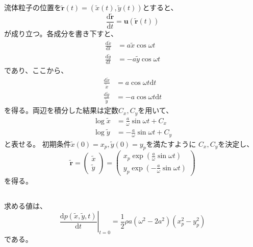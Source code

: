 \documentclass[a4paper]{jsarticle}
\begin{document}
\subsection{}
流体粒子の位置を$\tilde{\boldsymbol{r}}(t) = (\tilde{x}(t), \tilde{y}(t))$とすると、
\begin{equation}
  \frac{\mathrm{d} \tilde{\boldsymbol{r}}}{\mathrm{d} t} = \boldsymbol{u}(\tilde{\boldsymbol{r}}(t)) 
\end{equation}
が成り立つ。各成分を書き下すと、
\begin{equation}
  \begin{aligned}
    \frac{\mathrm{d} \tilde{x}}{\mathrm{d} t} &= a \tilde{x} \cos \omega t \\
    \frac{\mathrm{d} \tilde{y}}{\mathrm{d} t} &= -a \tilde{y} \cos \omega t
  \end{aligned}
\end{equation}
であり、ここから、
\begin{equation}
  \begin{aligned}
    \frac{\mathrm{d} \tilde{x}}{\tilde{x}} &= a \cos \omega t \mathrm{d} t \\
    \frac{\mathrm{d} \tilde{y}}{\tilde{y}} &= -a \cos \omega t \mathrm{d} t
  \end{aligned}
\end{equation}
を得る。両辺を積分した結果は定数$C_x, C_y$を用いて、
\begin{equation}
  \begin{aligned}
    \log \tilde{x} &= \frac{a}{\omega} \sin \omega t + C_x \\
    \log \tilde{y} &= -\frac{a}{\omega} \sin \omega t + C_y
  \end{aligned}
\end{equation}
と表せる。
初期条件$\tilde{x}(0) = x_p, \tilde{y}(0) = y_p$を満たすように
$C_x, C_y$を決定し、
\begin{equation}
  \tilde{\boldsymbol{r}} =
  \begin{pmatrix}
    \tilde{x} \\ \tilde{y}
  \end{pmatrix} =
  \begin{pmatrix}
    x_p \exp \left(\frac{a}{\omega} \sin \omega t\right) \\
    y_p \exp \left(-\frac{a}{\omega} \sin \omega t\right)
  \end{pmatrix}
\end{equation}
を得る。

\subsection{}
求める値は、
\begin{equation}
  \left.\frac{\mathrm{d} p(\tilde{x}, \tilde{y}, t)}{\mathrm{d} t}\right|_{t = 0}
  = \frac{1}{2} \rho a (\omega^2 - 2 a^2)(x_p^2 - y_p^2)
\end{equation}
である。
\end{document}
